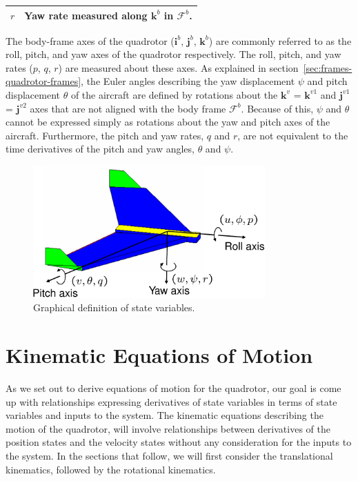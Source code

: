 {\begin{table}
\begin{tabular}{|c|l|}
$r$ & Yaw rate measured along $\mathbf{k}^b$ in $\mathcal{F}^b$. \\
\hline
\end{tabular}
\end{table} 
%
The body-frame axes of the quadrotor ($\mathbf{i}^b$, $\mathbf{j}^b$, $\mathbf{k}^b$) are commonly referred to as the roll, pitch, and yaw axes of the quadrotor respectively. The roll, pitch, and yaw rates ($p$, $q$, $r$) are measured about these axes. As explained in section~\ref{sec:frames-quadrotor-frames}, the Euler angles describing the yaw displacement $\psi$ and pitch displacement $\theta$ of the aircraft are defined by rotations about the $\mathbf{k}^{v}$ = $\mathbf{k}^{v1}$ and $\mathbf{j}^{v1}$ = $\mathbf{j}^{v2}$ axes that are not aligned with the body frame $\mathcal{F}^b$. Because of this, $\psi$ and $\theta$ cannot be expressed simply as rotations about the yaw and pitch axes of the aircraft. Furthermore, the pitch and yaw rates, $q$ and $r$, are not equivalent to the time derivatives of the pitch and yaw angles, $\theta$ and $\psi$. 
%
\begin{figure}[hhhhtb]
\begin{center}
\includegraphics[width=3.5in]{chap3_multirotor/figures/kin-axis-definition}
\end{center}
\caption{Graphical definition of state variables.} \label{fig:eom-state-variables}
\end{figure}

\section{Kinematic Equations of Motion}
As we set out to derive equations of motion for the quadrotor, our goal is come up with relationships expressing derivatives of state variables in terms of state variables and inputs to the system. The kinematic equations describing the motion of the quadrotor, will involve relationships between derivatives of the position states and the velocity states without any consideration for the inputs to the system. In the sections that follow, we will first consider the translational kinematics, followed by the rotational kinematics.

}
